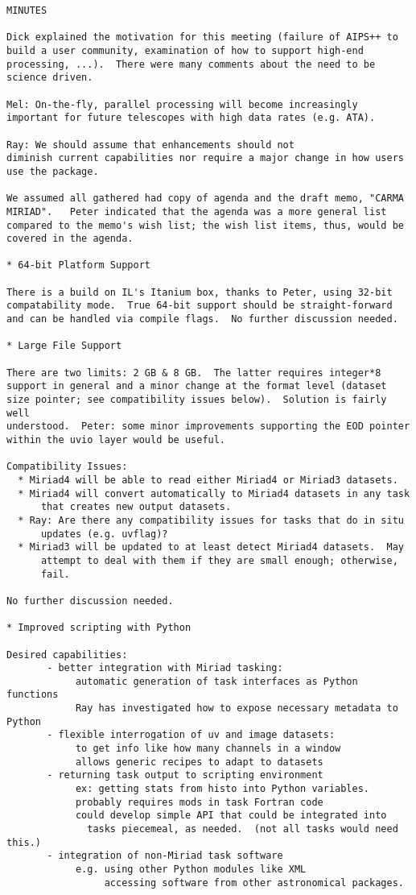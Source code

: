 \begin{verbatim}
MINUTES

Dick explained the motivation for this meeting (failure of AIPS++ to
build a user community, examination of how to support high-end
processing, ...).  There were many comments about the need to be
science driven.  

Mel: On-the-fly, parallel processing will become increasingly
important for future telescopes with high data rates (e.g. ATA).  

Ray: We should assume that enhancements should not
diminish current capabilities nor require a major change in how users
use the package.  

We assumed all gathered had copy of agenda and the draft memo, "CARMA
MIRIAD".   Peter indicated that the agenda was a more general list
compared to the memo's wish list; the wish list items, thus, would be
covered in the agenda.

* 64-bit Platform Support

There is a build on IL's Itanium box, thanks to Peter, using 32-bit
compatability mode.  True 64-bit support should be straight-forward
and can be handled via compile flags.  No further discussion needed.

* Large File Support

There are two limits: 2 GB & 8 GB.  The latter requires integer*8
support in general and a minor change at the format level (dataset
size pointer; see compatibility issues below).  Solution is fairly well
understood.  Peter: some minor improvements supporting the EOD pointer
within the uvio layer would be useful.  

Compatibility Issues:  
  * Miriad4 will be able to read either Miriad4 or Miriad3 datasets.
  * Miriad4 will convert automatically to Miriad4 datasets in any task
      that creates new output datasets.
  * Ray: Are there any compatibility issues for tasks that do in situ
      updates (e.g. uvflag)? 
  * Miriad3 will be updated to at least detect Miriad4 datasets.  May
      attempt to deal with them if they are small enough; otherwise,
      fail.  

No further discussion needed.

* Improved scripting with Python

Desired capabilities:
       - better integration with Miriad tasking:
            automatic generation of task interfaces as Python functions
            Ray has investigated how to expose necessary metadata to Python 
       - flexible interrogation of uv and image datasets:
            to get info like how many channels in a window
            allows generic recipes to adapt to datasets
       - returning task output to scripting environment
            ex: getting stats from histo into Python variables.
            probably requires mods in task Fortran code
            could develop simple API that could be integrated into
              tasks piecemeal, as needed.  (not all tasks would need this.)
       - integration of non-Miriad task software
            e.g. using other Python modules like XML
                 accessing software from other astronomical packages. 


\end{verbatim}
